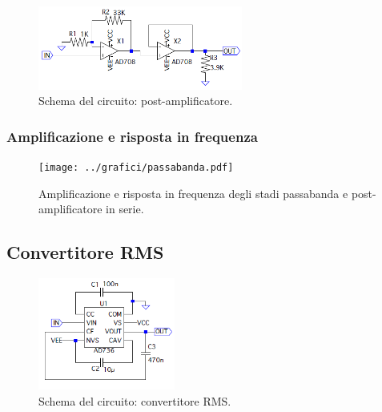 \documentclass[a4paper,10pt]{article}
\begin{document}
\lipsum[4-5]

\begin{figure}
	\vspace{-10pt}
	\centering
	\includegraphics[width=0.6\textwidth]{../grafici/PostAmp.png}
	\vspace{-12pt}
	\caption{Schema del circuito: post-amplificatore.}
	\label{fig:powamp}
	\vspace{-6pt}
\end{figure}

\lipsum[6-7]

\subsubsection*{Amplificazione e risposta in frequenza}

\lipsum[4]

\begin{figure}[H]
	\centering
	\texttt{[image: ../grafici/passabanda.pdf]}
	\vspace*{10pt}
	\caption{Amplificazione e risposta in frequenza degli stadi passabanda e post-amplificatore in serie.}
	\label{fig:blocks}
\end{figure}

\subsection{Convertitore RMS}

\begin{figure}
	\vspace{-10pt}
	\centering
	\includegraphics[width=0.4\textwidth]{../grafici/RMSconverter.png}
	\vspace{-12pt}
	\caption{Schema del circuito: convertitore RMS.}
	\label{fig:powamp}
	\vspace{-6pt}
\end{figure}
\end{document}
